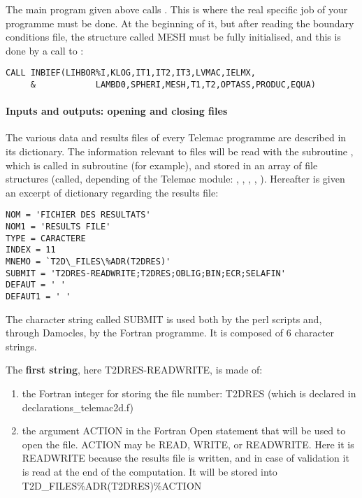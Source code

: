 The main program  given above calls .
This is where the real specific job of your programme must be done. At the
beginning of it, but after reading the boundary conditions file, the
 structure called MESH must be fully initialised, and this
is done by a call to :

\begin{lstlisting}[language=TelFortran]
      CALL INBIEF(LIHBOR%I,KLOG,IT1,IT2,IT3,LVMAC,IELMX,
     &            LAMBD0,SPHERI,MESH,T1,T2,OPTASS,PRODUC,EQUA)
\end{lstlisting}

\paragraph{Inputs and outputs: opening and closing files}

The various data and results files of every Telemac programme are described in
its dictionary. The information relevant to files will be read with the
subroutine , which is called in subroutine
 (for example), and stored in an array of file
structures (called, depending of the Telemac module: ,
, , ,
). Hereafter is given an excerpt of  dictionary
regarding the results file:

\begin{lstlisting}[language=TelemacCas]
NOM = 'FICHIER DES RESULTATS'
NOM1 = 'RESULTS FILE'
TYPE = CARACTERE
INDEX = 11
MNEMO = `T2D\_FILES\%ADR(T2DRES)'
SUBMIT = 'T2DRES-READWRITE;T2DRES;OBLIG;BIN;ECR;SELAFIN'
DEFAUT = ' '
DEFAUT1 = ' '
\end{lstlisting}

The character string called SUBMIT is used both by the perl scripts and,
through Damocles, by the Fortran programme. It is composed of 6 character
strings.

The \textbf{first string}, here T2DRES-READWRITE, is made of:

\begin{enumerate}
\item  the Fortran integer for storing the file number: T2DRES (which is
  declared in declarations\_telemac2d.f)
\item  the argument ACTION in the Fortran Open statement that will be used to
  open the file. ACTION may be READ, WRITE, or READWRITE. Here it is READWRITE
  because the results file is written, and in case of validation it is read at
  the end of the computation. It will be stored into
  T2D\_FILES\%ADR(T2DRES)\%ACTION
\end{enumerate}


